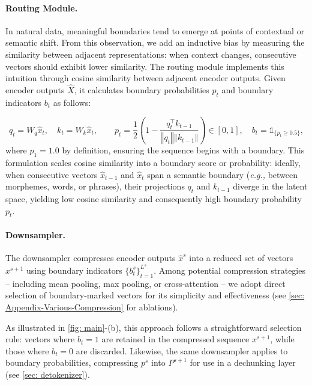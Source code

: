 \documentclass{article}
\newcommand{\dechunk}{dechunking layer}
\newcommand{\router}{routing module}
\newcommand{\ROUTER}{Routing Module}
\newcommand{\downsampler}{downsampler}
\newcommand{\Downsampler}{Downsampler}
\newcommand{\eg}{\emph{e.g.,}}
\theoremstyle{plain}
\theoremstyle{remark}
\begin{document}
\paragraph{\ROUTER{}.}
In natural data, meaningful boundaries tend to emerge at points of contextual or semantic shift.
From this observation, we add an inductive bias by measuring the similarity between adjacent representations: when context changes, consecutive vectors should exhibit lower similarity.
The \router{} implements this intuition through cosine similarity between adjacent encoder outputs.
Given encoder outputs $\hat{X}$, it calculates boundary probabilities $p_t$ and boundary indicators $b_t$ as follows:

\begin{equation}
\label{eq: Rounting-Module}
q_t = W_q \hat{x}_t, \quad k_t = W_k \hat{x}_t, \qquad p_t = \frac{1}{2} \left(1 - \frac{q_t^\top k_{t-1}}{\left\Vert q_t \right\Vert \left\Vert k_{t-1} \right\Vert}\right) \in [0, 1], \quad b_t = \mathds{1}_{\{p_t \geq 0.5\}},
\end{equation}
where $p_1 = 1.0$ by definition, ensuring the sequence begins with a boundary.
This formulation scales cosine similarity into a boundary score or probability: ideally, when consecutive vectors $\hat{x}_{t-1}$ and $\hat{x}_t$ span a semantic boundary (\eg{} between morphemes, words, or phrases), their projections $q_t$ and $k_{t-1}$ diverge in the latent space, yielding low cosine similarity and consequently high boundary probability $p_t$.

\paragraph{\Downsampler{}.}
The \downsampler{} compresses encoder outputs $\hat{x}^s$ into a reduced set of vectors $x^{s+1}$ using boundary indicators $\{b_t^s\}_{t=1}^{L^s}$.
Among potential compression strategies -- including mean pooling, max pooling, or cross-attention -- we adopt direct selection of boundary-marked vectors for its simplicity and effectiveness (see \cref{sec: Appendix-Various-Compression} for ablations).

As illustrated in \cref{fig: main}-(b), this approach follows a straightforward selection rule: vectors where $b_t = 1$ are retained in the compressed sequence $x^{s+1}$, while those where $b_t = 0$ are discarded.
Likewise, the same \downsampler{} applies to boundary probabilities, compressing $p^s$ into $P^{s+1}$ for use in a \dechunk{} (see \cref{sec: detokenizer}).
\end{document}
